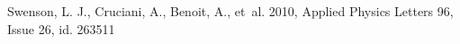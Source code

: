 \begin{thebibliography}{99}
Swenson, L. J., Cruciani, A., Benoit, A., {et~al.} 2010, 
Applied Physics Letters 96, Issue 26, id. 263511

  
  




\end{thebibliography}
